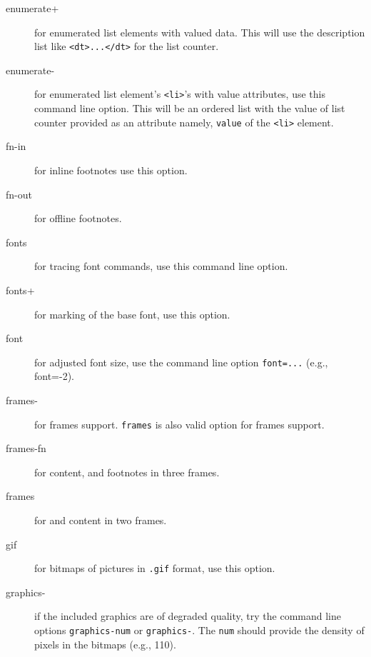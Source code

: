 \documentclass[a4paper]{article}
\begin{document}
\begin{description}

\item[enumerate+] for enumerated list elements with valued data. This
  will use the description list like \verb=<dt>...</dt>= for the list
  counter.

\item[enumerate-] for enumerated list element's \verb=<li>='s with
  value attributes, use this command line option. This will be an
  ordered list with the value of list counter provided as an attribute
  namely, \verb=value= of the \verb=<li>= element.


\item[fn-in] for inline footnotes use this option.

\item[fn-out] for offline footnotes.

\item[fonts] for tracing \latex font commands, use this command line
  option.

\item[fonts+] for marking of the base font, use this option.

\item[font] for adjusted font size, use the command line option
  \verb+font=...+ (e.g., font=-2).

\item[frames-] for frames support. \verb=frames= is also valid option
  for frames support.

\item[frames-fn] for content, \xspace and footnotes in
  three frames.

\item[frames] for \space and content in two frames.


\item[gif] for bitmaps of pictures in \verb=.gif= format, use this
  option.

\item[graphics-] if the included graphics are of degraded quality, try
  the command line options \verb=graphics-num= or \verb=graphics-=.
  The \verb=num= should provide the density of pixels in the bitmaps
  (e.g., 110).



\end{description}
\end{document}
